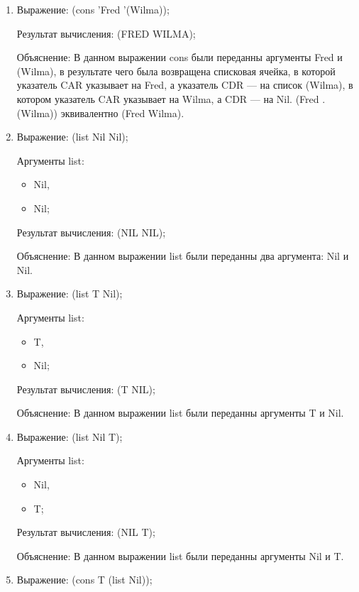 \documentclass[a4paper,oneside,14pt]{extarticle}
\begin{document}
\begin{enumerate}
    \item 
        Выражение: (cons 'Fred '(Wilma));

        Результат вычисления: (FRED WILMA);

        Объяснение: В данном выражении cons были переданны аргументы Fred и (Wilma), в результате чего была возвращена списковая ячейка, в которой указатель CAR указывает на Fred, а указатель CDR --- на список (Wilma), в котором указатель CAR указывает на Wilma, а CDR --- на Nil. (Fred . (Wilma)) эквивалентно (Fred Wilma).

    \item 
        Выражение: (list Nil Nil);

        Аргументы list:
        \begin{itemize}
            \item Nil,
            \item Nil;
        \end{itemize}

        Результат вычисления: (NIL NIL);

        Объяснение: В данном выражении list были переданны два аргумента: Nil и Nil.

    \item 
        Выражение: (list T Nil);

        Аргументы list:
        \begin{itemize}
            \item T,
            \item Nil;
        \end{itemize}

        Результат вычисления: (T NIL);

        Объяснение: В данном выражении list были переданны аргументы T и Nil.

    \item 
        Выражение: (list Nil T);

        Аргументы list:
        \begin{itemize}
            \item Nil,
            \item T;
        \end{itemize}

        Результат вычисления: (NIL T);

        Объяснение: В данном выражении list были переданны аргументы Nil и T.

    \item 
        Выражение: (cons T (list Nil));


\end{enumerate}
\end{document}
